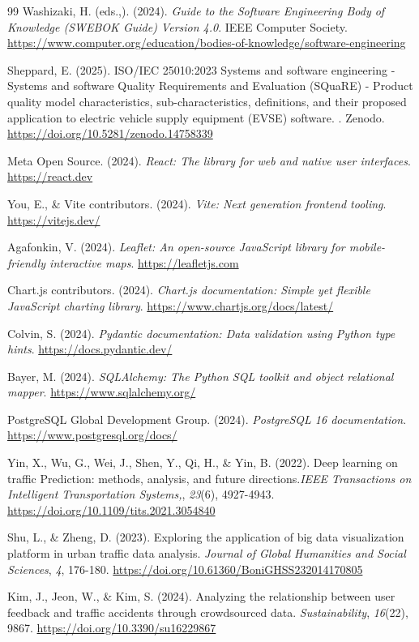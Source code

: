\documentclass[12pt,a4paper]{report}
\begin{document}
\begin{thebibliography}{99}
Washizaki, H. (eds.,). (2024). \textit{Guide to the Software Engineering Body of Knowledge (SWEBOK Guide) Version 4.0}. IEEE Computer Society. \url{https://www.computer.org/education/bodies-of-knowledge/software-engineering}

Sheppard, E. (2025). ISO/IEC 25010:2023 Systems and software engineering - Systems and software Quality Requirements and Evaluation (SQuaRE) - Product quality model characteristics, sub-characteristics, definitions, and their proposed application to electric vehicle supply equipment (EVSE) software.  \textit{}. Zenodo. \url{https://doi.org/10.5281/zenodo.14758339}

Meta Open Source. (2024). \textit{React: The library for web and native user interfaces}. \url{https://react.dev}

You, E., \& Vite contributors. (2024). \textit{Vite: Next generation frontend tooling}. \url{https://vitejs.dev/}

Agafonkin, V. (2024). \textit{Leaflet: An open-source JavaScript library for mobile-friendly interactive maps}. \url{https://leafletjs.com}


Chart.js contributors. (2024). \textit{Chart.js documentation: Simple yet flexible JavaScript charting library}. \url{https://www.chartjs.org/docs/latest/}

Colvin, S. (2024). \textit{Pydantic documentation: Data validation using Python type hints}. \url{https://docs.pydantic.dev/}

Bayer, M. (2024). \textit{SQLAlchemy: The Python SQL toolkit and object relational mapper}. \url{https://www.sqlalchemy.org/}

PostgreSQL Global Development Group. (2024). \textit{PostgreSQL 16 documentation}. \url{https://www.postgresql.org/docs/}

Yin, X., Wu, G., Wei, J., Shen, Y., Qi, H., \& Yin, B. (2022). Deep learning on traffic Prediction: methods, analysis, and future directions.\textit{IEEE Transactions on Intelligent Transportation Systems,}, \textit{23}(6), 4927-4943. \url{https://doi.org/10.1109/tits.2021.3054840}

Shu, L., \& Zheng, D. (2023). Exploring the application of big data visualization platform in urban traffic data analysis. \textit{Journal of Global Humanities and Social Sciences}, \textit{4}, 176-180. \url{https://doi.org/10.61360/BoniGHSS232014170805}

Kim, J., Jeon, W., \& Kim, S. (2024). Analyzing the relationship between user feedback and traffic accidents through crowdsourced data. \textit{Sustainability}, \textit{16}(22), 9867. \url{https://doi.org/10.3390/su16229867}

\end{thebibliography}
\end{document}
